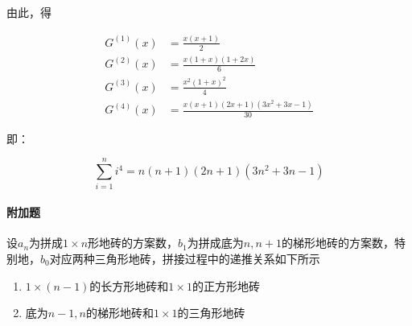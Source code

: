 \documentclass{../notes}
\newcommand{\Gx}[1]{G^{(#1)}(x)}
\begin{document}
    由此，得

    \begin{equation}
        \begin{aligned}
            \Gx 1 &= \frac{x(x+1)}{2} \\
            \Gx 2 &= \frac{x(1+x)(1+2x)}{6} \\
            \Gx 3 &= \frac{x^2(1 + x)^2}{4} \\
            \Gx 4 &= \frac{x(x+1) (2x+1) \left(3x^2+3 x-1\right)}{30}
        \end{aligned}
    \end{equation}

    即：

    \begin{equation}
        \sum_{i=1}^n i^4 = n(n+1) (2n+1) \left(3n^2+3 n-1\right)
    \end{equation}

    \paragraph*{附加题} 设$a_n$为拼成$1\times n$形地砖的方案数，$b_1$为拼成底为$n, n+1$的梯形地砖的方案数，特别地，$b_0$对应两种三角形地砖，拼接过程中的递推关系如下所示

    \begin{enumerate}
        \item $1\times (n-1)$的长方形地砖和$1\times 1$的正方形地砖
        \item 底为$n-1, n$的梯形地砖和$1\times 1$的三角形地砖
    \end{enumerate}
\end{document}
